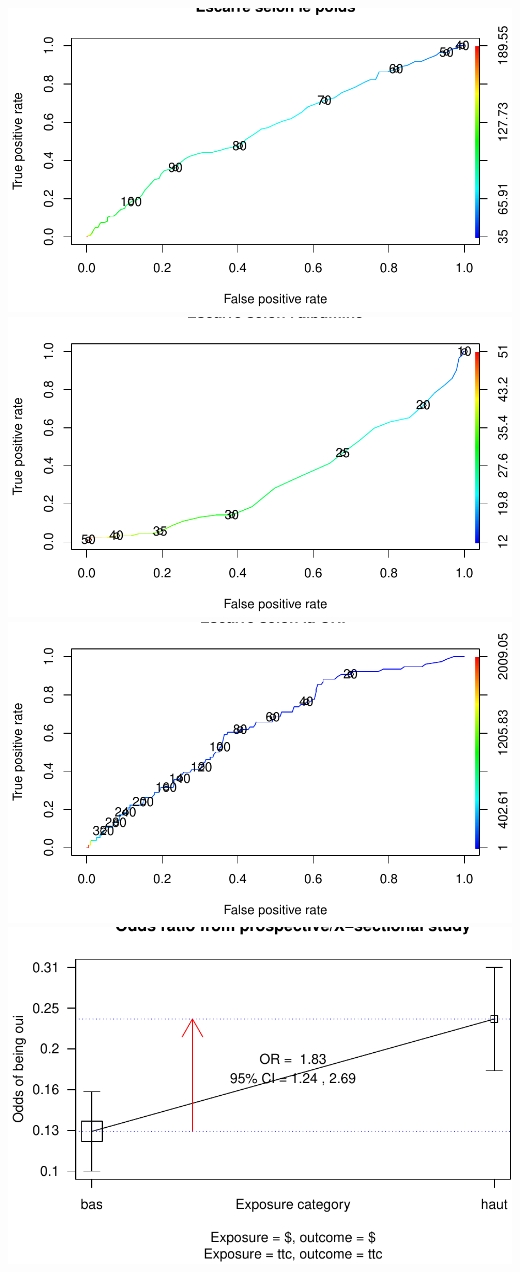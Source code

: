 \documentclass[]{article}
\begin{document}
\includegraphics{book_escarre_files/figure-latex/roc-1.pdf}
\includegraphics{book_escarre_files/figure-latex/roc-2.pdf}
\includegraphics{book_escarre_files/figure-latex/roc-3.pdf}
\includegraphics{book_escarre_files/figure-latex/roc-4.pdf}
\end{document}
